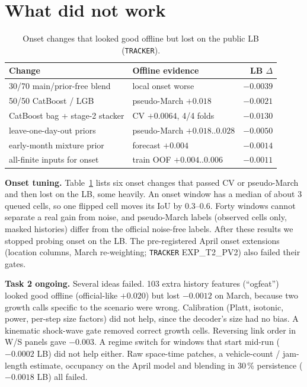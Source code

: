 \documentclass[conference,10pt]{IEEEtran}
\newcommand{\file}[1]{\texttt{\small #1}}
\begin{document}
\section{What did not work}\label{sec:neg}
\begin{table}[t]
\centering
\caption{Onset changes that looked good offline but lost on the public LB (\file{TRACKER}).}
\label{tab:onset}
\setlength{\tabcolsep}{3pt}
\begin{tabular}{@{}llr@{}}
\toprule
Change & Offline evidence & LB $\Delta$ \\
\midrule
30/70 main/prior-free blend & local onset worse & $-0.0039$ \\
50/50 CatBoost / LGB & pseudo-March $+0.018$ & $-0.0021$ \\
CatBoost bag + stage-2 stacker & CV $+0.0064$, 4/4 folds & $-0.0130$ \\
leave-one-day-out priors & pseudo-March $+0.018..0.028$ & $-0.0050$ \\
early-month mixture prior & forecast $+0.004$ & $-0.0014$ \\
all-finite inputs for onset & train OOF $+0.004..0.006$ & $-0.0011$ \\
\bottomrule
\end{tabular}
\end{table}

\textbf{Onset tuning.} Table~\ref{tab:onset} lists six onset changes that passed CV or pseudo-March and then lost on the LB, some
heavily. An onset window has a median of about 3 queued cells, so one flipped cell moves its IoU by 0.3--0.6. Forty windows cannot separate a
real gain from noise, and pseudo-March labels (observed cells only, masked histories) differ from the official noise-free labels.
After these results we stopped probing onset on the LB. The pre-registered April onset extensions (location columns, March
re-weighting; \file{TRACKER} EXP\_T2\_PV2) also failed their gates.

\textbf{Task 2 ongoing.} Several ideas failed. 103 extra history features (``ogfeat'') looked good offline (official-like $+0.020$) but lost
$-0.0012$ on March, because two growth calls specific to the scenario were wrong. Calibration (Platt, isotonic, power, per-step size factors)
did not help, since the decoder's size had no bias. A kinematic shock-wave gate removed correct growth cells. Reversing link order
in W/S panels gave $-0.003$. A regime switch for windows that start mid-run ($-0.0002$ LB) did not help either. Raw space-time patches, a vehicle-count / jam-length estimate, occupancy on the
April model and blending in 30\,\% persistence ($-0.0018$ LB) all failed.
\end{document}
